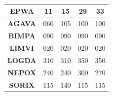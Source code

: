 
\centering
{}
\begin{tabular}{|c|c|c|c|c|}
	\hline
	\rowcolor{white}
	\color{white}\cellcolor{vred}\textbf{EPWA} & \textbf{11} & \textbf{15} & \textbf{29} & \textbf{33} \\\hline
	\textbf{AGAVA}                             & 060         & 105         & 100         & 100         \\\hline
	\textbf{BIMPA}                             & 090         & 090         & 090         & 090         \\\hline
	\textbf{LIMVI}                             & 020         & 020         & 020         & 020         \\\hline
	\textbf{LOGDA}                             & 310         & 310         & 350         & 350         \\\hline
	\textbf{NEPOX}                             & 240         & 240         & 300         & 270         \\\hline
	\textbf{SORIX}                             & 115         & 140         & 115         & 115         \\\hline
\end{tabular}

